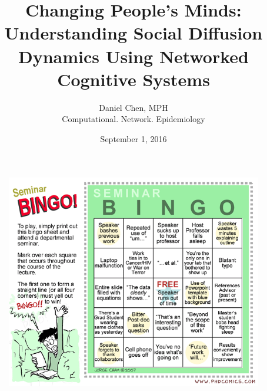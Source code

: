 \documentclass[compress]{beamer}
\title[SDAL]{\vspace{-0.85in}Changing People's Minds: Understanding Social Diffusion Dynamics Using Networked Cognitive Systems}
\author{Daniel Chen, MPH\\ \tiny{Computational. Network. Epidemiology}}
\date[]{September 1, 2016}
\begin{document}
	\begin{frame}[BlankLogo] \frametitle{}
		\begin{figure}
	\centering
	\includegraphics[height=0.9\textheight]{../phd040907s_bingo}
	\label{fig:phd040907sbingo}
	\end{figure}
	
	\end{frame}
	
	\begin{frame}[Title]
		\titlepage
	\end{frame}



\end{document}
